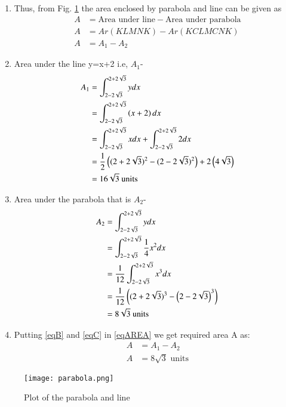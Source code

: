 \documentclass[journal,12pt,twocolumn]{IEEEtran}
\begin{document}
\begin{enumerate}
  \item Thus, from Fig. \ref{Plot of the Parabola and line} the area enclosed by parabola and line can be given as
\begin{align}
   A&= \text{Area under line} - \text{Area under parabola}
     \\
   A&= Ar(KLMNK)-Ar(KCLMCNK)
    \\
    A&= A_1 -A_2 \label{eqAREA}
    \end{align}
\item Area under the line y=x+2 i.e, $A_1$-
\begin{align}
  A_1&= \int_{2-2\sqrt{3}}^{2+2\sqrt{3}} y dx
    \\
   &= \int_{2-2\sqrt{3}}^{2+2\sqrt{3}} \left(x+2\right) dx\\
   &= \int_{2-2\sqrt{3}}^{2+2\sqrt{3}}x dx+\int_{2-2\sqrt{3}}^{2+2\sqrt{3}}2 dx\\
    &= \frac{1}{2}\left((2+2\sqrt{3})^2-(2-2\sqrt{3})^2\right) +2\left(4\sqrt{3}\right)
    \\
    &=16\sqrt{3} \text{ units} \label{eqB}
\end{align}
\item Area under the parabola that is $A_2$-
\begin{align}
    A_2&= \int_{2-2\sqrt{3}}^{2+2\sqrt{3}} y dx
    \\
    &= \int_{2-2\sqrt{3}}^{2+2\sqrt{3}} \frac{1}{4} x^2 dx
    \\
   &= \frac{1}{12} \int_{2-2\sqrt{3}}^{2+2\sqrt{3}} x^3 dx
    \\
    &= \frac{1}{12} \left((2+2\sqrt{3})^3-\left(2-2\sqrt{3}\right)^3\right)
    \\
    &= 8\sqrt{3} \text{ units} \label{eqC}
\end{align}
\item Putting \eqref{eqB} and \eqref{eqC} in \eqref{eqAREA} we get required area A as:
\begin{align}
 A &= A_1 -A_2 
 \\
 A &= 8\sqrt{3} \text{ units}
\end{align}
%
\end{enumerate}
\begin{figure}[ht]
\centering
\texttt{[image: parabola.png]}
\caption{Plot of the parabola and line}
\label{Plot of the Parabola and line}
\end{figure}
\end{document}
